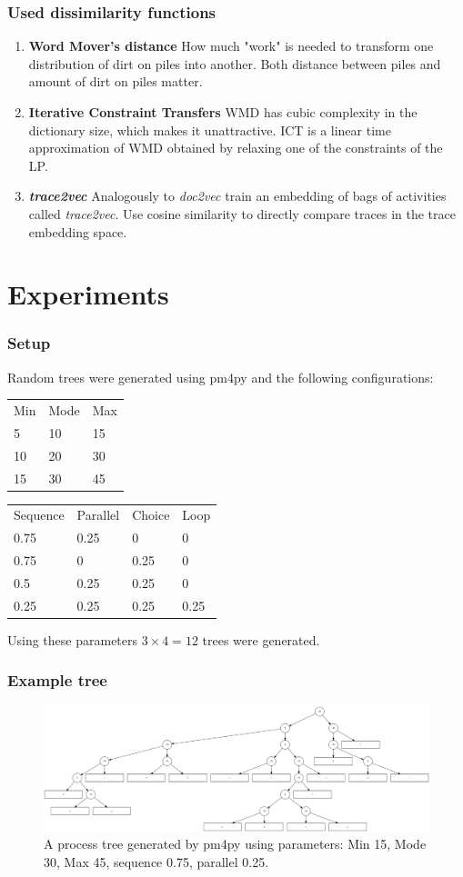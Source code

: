 \documentclass{beamer}
\begin{document}
	
	\begin{frame}
		\frametitle{Used dissimilarity functions}
		\begin{enumerate}
			\item \textbf{Word Mover's distance} How much "work" is needed to transform one distribution of dirt on piles into another. Both distance between piles and amount of dirt on piles matter.
			\item \textbf{Iterative Constraint Transfers} WMD has cubic complexity in the dictionary size, which makes it unattractive. ICT is a linear time approximation of WMD obtained by relaxing one of the constraints of the LP.
			\item \textbf{\emph{trace2vec}} Analogously to \emph{doc2vec} train an embedding of bags of activities called \emph{trace2vec}. Use cosine similarity to directly compare traces in the trace embedding space.
		\end{enumerate}
	\end{frame}
	
	\section{Experiments}
	\begin{frame}
		\frametitle{Setup}
		Random trees were generated using pm4py and the following configurations:
		
		\begin{tabular}{lll}
			Min & Mode & Max \\
			5 & 10 & 15 \\
			10 & 20 & 30 \\
			15 & 30 & 45 \\
		\end{tabular}
		\begin{tabular}{llll}
			Sequence & Parallel & Choice & Loop \\
			0.75 & 0.25 & 0 & 0 \\
			0.75 & 0 & 0.25 & 0 \\
			0.5 & 0.25 & 0.25 & 0 \\
			0.25 & 0.25 & 0.25 & 0.25 \\
		\end{tabular}
		
		Using these parameters $3\times4=12$ trees were generated.
	\end{frame}
	\begin{frame}
		\frametitle{Example tree}
		\begin{figure}
			\includegraphics[width=1\textwidth]{figures/process-tree}
			\caption{A process tree generated by pm4py using parameters: Min 15, Mode 30, Max 45, sequence 0.75, parallel 0.25. }
			\label{fig:process-tree}
		\end{figure}
	\end{frame}
	
\end{document}
